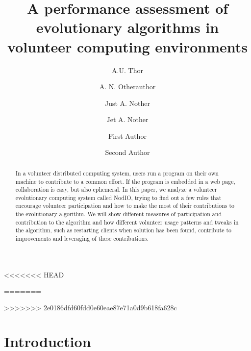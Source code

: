 \documentclass[runningheads,a4paper]{llncs}\usepackage[]{graphicx}\usepackage[]{color}
\begin{document}



\title{A performance assessment of evolutionary algorithms in
  volunteer computing environments} 

<<<<<<< HEAD


\author{A.U. Thor \and A. N. Otherauthor \and Just A. Nother 
  \and Jet A. Nother }

=======
\author{First Author \and Second Author}

>>>>>>> 2e0186dfd60fdd0e60eae87e71a0d9b618fa628c

\maketitle


\begin{abstract}
In a volunteer distributed computing system, users run a program on
their own machine to contribute to a common effort. If the program is
embedded in a web page, collaboration is easy, but also ephemeral. In
this paper, we analyze a volunteer evolutionary computing system called
NodIO, trying to find out a few rules that encourage volunteer
participation and how to make the most of their contributions to the
evolutionary algorithm. We will show different measures of
participation and contribution to the algorithm and how different
volunteer usage patterns and tweaks in the algorithm, such as restarting clients when solution has been found, contribute to
improvements and leveraging of these contributions. 
\end{abstract}

\section{Introduction}
\label{introduction}
\end{document}
